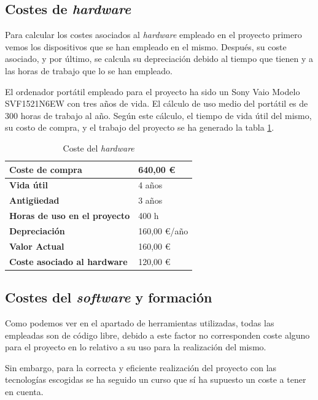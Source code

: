 \subsection{Costes de \textit{hardware}}
Para calcular los costes asociados al \textit{hardware} empleado en el proyecto primero vemos los dispositivos que se han empleado en el mismo. Después, su coste asociado, y por último, se calcula su depreciación debido al tiempo que tienen y a las horas de trabajo que lo se han empleado.


El ordenador portátil empleado para el proyecto ha sido un Sony Vaio Modelo SVF1521N6EW con tres años de vida. El cálculo de uso medio del portátil es de 300 horas de trabajo al año. Según este cálculo, el tiempo de vida útil del mismo, su costo de compra, y el trabajo del proyecto se ha generado la tabla \ref{fig:coste_hw}.


\begin{table}[htpb]
\centering
\begin{tabular}{|l|l|}
\hline
\textbf{Coste de compra}             & 640,00 \euro     \\ \hline
\textbf{Vida útil}                   & 4 años       \\ \hline
\textbf{Antigüedad}                  & 3 años       \\ \hline
\textbf{Horas de uso en el proyecto} & 400 h        \\ \hline
\textbf{Depreciación}                & 160,00 \euro/año \\ \hline
\textbf{Valor Actual}                & 160,00 \euro     \\ \hline
\textbf{Coste asociado al hardware}  & 120,00 \euro     \\ \hline
\end{tabular}
\caption{Coste del \textit{hardware}}
\label{fig:coste_hw}
\end{table}


\subsection{Costes del \textit{software} y formación}
Como podemos ver en el apartado de herramientas utilizadas, todas las empleadas son de código libre, debido a este factor no corresponden coste alguno para el proyecto en lo relativo a su uso para la realización del mismo.


Sin embargo, para la correcta y eficiente realización del proyecto con las tecnologías escogidas se ha seguido un curso que sí ha supuesto un coste a tener en cuenta.


